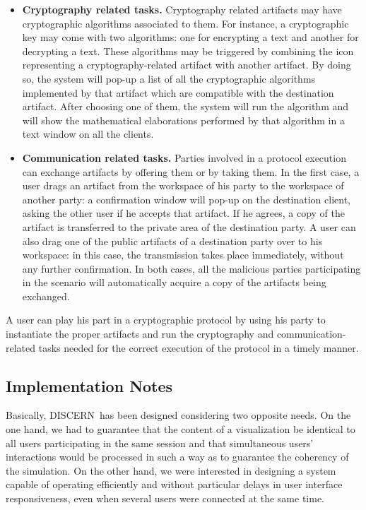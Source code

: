 \documentclass[10pt,conference]{IEEEtran}
\def\disgrace{DISCERN}
\begin{document}
\begin{itemize}
\item{\bf Cryptography related tasks.} Cryptography related artifacts
  may have cryptographic algorithms associated to them. For instance,
  a cryptographic key may come with two algorithms: one for encrypting
  a text and another for decrypting a text. These algorithms may be
  triggered by combining the icon representing a cryptography-related
  artifact with another artifact. By doing so, the system will pop-up
  a list of all the cryptographic algorithms implemented by that
  artifact which are compatible with the destination artifact. After
  choosing one of them, the system will run the algorithm and will
  show the mathematical elaborations performed by that algorithm in a
  text window on all the clients.

\item{\bf Communication related tasks.} Parties involved in a protocol
  execution can exchange artifacts by offering them or by taking
  them. In the first case, a user drags an artifact from the workspace
  of his party to the workspace of another party: a confirmation
  window will pop-up on the destination client, asking the other user
  if he accepts that artifact. If he agrees, a copy of the artifact is
  transferred to the private area of the destination party. A user can
  also drag one of the public artifacts of a destination party over to
  his workspace: in this case, the transmission takes place
  immediately, without any further confirmation. In both cases, all
  the malicious parties participating in the scenario will
  automatically acquire a copy of the artifacts being exchanged.
\end{itemize}

A user can play his part in a cryptographic protocol by using his
party to instantiate the proper artifacts and run the cryptography and
communication-related tasks needed for the correct execution of the
protocol in a timely manner.




\subsection{Implementation Notes}
Basically, \disgrace\ has been designed considering two opposite
needs. On the one hand, we had to guarantee that the content of a
visualization be identical to all users participating in the same
session and that simultaneous users' interactions would be processed
in such a way as to guarantee the coherency of the simulation. On the
other hand, we were interested in designing a system capable of
operating efficiently and without particular delays in user interface
responsiveness, even when several users were connected at the same
time.
\end{document}
